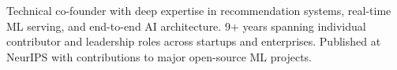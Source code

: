 \begin{cvparagraph}
Technical co-founder with deep expertise in recommendation systems, real-time ML serving, and end-to-end AI architecture. 9+ years spanning individual contributor and leadership roles across startups and enterprises. Published at NeurIPS with contributions to major open-source ML projects.
\end{cvparagraph}